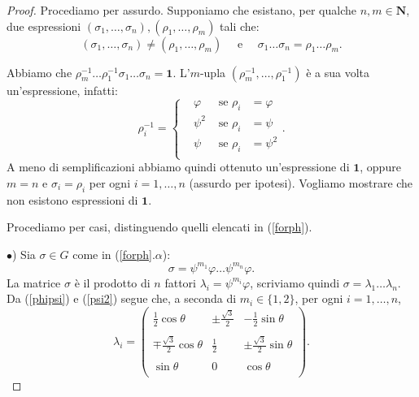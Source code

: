 \documentclass[a4paper,oneside,11pt]{book}
\theoremstyle{definition} \newtheorem{Def}{Definizione}
\theoremstyle{plain} \newtheorem{teo}{Teorema}
\theoremstyle{plain} \newtheorem{cor}[teo]{Corollario}
\theoremstyle{definition} \newtheorem{lem}[teo]{Lemma}
\theoremstyle{plain} \newtheorem{pro}[teo]{Proposizione}
\newcommand{\ug}[1]{(\ref{#1})} %
\begin{document}
	\begin{proof}
		Procediamo per assurdo. Supponiamo che esistano, per qualche $n, m \in \mathbf{N}$, due espressioni $(\sigma_1, \dots, \sigma_n), (\rho_1, \dots, \rho_m)$ tali che:
		\begin{equation*}
			(\sigma_1, \dots, \sigma_n) \neq (\rho_1, \dots, \rho_m)\quad  \text{ e }\quad \sigma_1 \dots \sigma_n = \rho_1 \dots \rho_m \text{.}
		\end{equation*}
		
		Abbiamo che $\rho_m^{-1} \dots \rho_1^{-1} \sigma_1 \dots \sigma_n = \mathbf{1}$. L'$m$-upla $(\rho_m^{-1}, \dots, \rho_1^{-1})$ è a sua volta un'espressione, infatti:
		\begin{equation*}
			\rho_i^{-1} = \left\{\begin{aligned}
				&\varphi &\text{ se } \rho_i &= \varphi\\
				&\psi^2 &\text{ se } \rho_i &= \psi\\
				&\psi &\text{ se } \rho_i &= \psi^2\\
			\end{aligned}\right. \text{.}
		\end{equation*}
		A meno di semplificazioni abbiamo quindi ottenuto un'espressione di $\mathbf{1}$, oppure $m = n$ e $\sigma_i = \rho_i$ per ogni $i = 1, \dots, n$ (assurdo per ipotesi). Vogliamo mostrare che non esistono espressioni di $\mathbf{1}$.
		
		Procediamo per casi, distinguendo quelli elencati in \ug{forph}.
			
		$\bullet$) Sia $\sigma \in G$ come in (\ref{forph}.$\alpha$):
		\begin{equation*}
			\sigma = \psi^{m_1} \varphi \dots \psi^{m_n} \varphi \text{.}
		\end{equation*}
		La matrice $\sigma$ è il prodotto di $n$ fattori $\lambda_i = \psi^{m_i} \varphi$, scriviamo quindi $\sigma = \lambda_1 \dots \lambda_n$.
		Da \ug{phipsi} e \ug{psi2} segue che, a seconda di $m_i \in \{1, 2\}$, per ogni $i = 1, \dots, n$,
		\begin{equation*}
			\lambda_i = \begin{pmatrix}
				\frac{1}{2} \cos \theta &\pm \frac{\sqrt{3}}{2} &-\frac{1}{2} \sin \theta\\ \\
				\mp \frac{\sqrt{3}}{2} \cos \theta &\frac{1}{2} &\pm \frac{\sqrt{3}}{2} \sin \theta \\ \\
				\sin \theta &0 &\cos \theta\\
			\end{pmatrix} \text{.}
		\end{equation*}
		

\end{proof}
\end{document}
